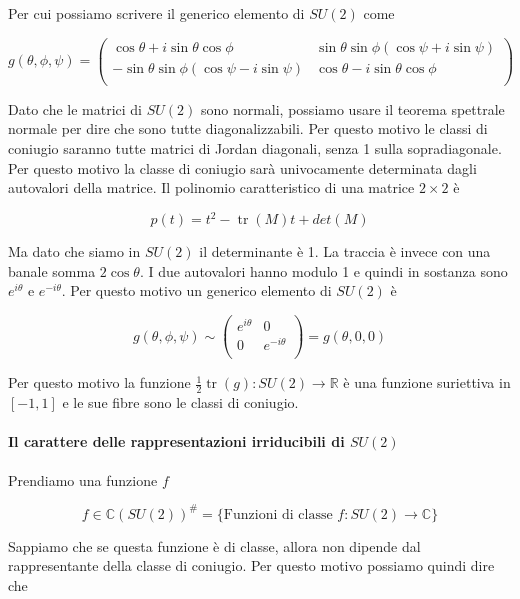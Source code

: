 \documentclass[11pt]{article}
\theoremstyle{plain}
\theoremstyle{definition}
\theoremstyle{remark}
\newcommand{\C}{\mathbb{C}}
\newcommand{\R}{\mathbb{R}}
\DeclareMathOperator{\tr}{tr}
\begin{document}
 Per cui possiamo scrivere il generico elemento di $SU(2)$ come

 \[
 g(\theta, \phi, \psi) = 
 \left(
 \begin{array}{cc}
   \cos\theta + i \sin\theta \cos\phi & \sin\theta\sin\phi( \cos\psi + i \sin\psi) \\
   -\sin\theta\sin\phi(\cos\psi - i \sin\psi) & \cos\theta - i \sin\theta\cos\phi  \\

 \end{array}
 \right)
 \]
 

 Dato che le matrici di $SU(2)$ sono normali, possiamo usare il teorema spettrale normale per dire che sono tutte diagonalizzabili. Per questo motivo le classi di coniugio saranno tutte matrici di Jordan diagonali, senza 1 sulla sopradiagonale. Per questo motivo la classe di coniugio sarà univocamente determinata dagli autovalori della matrice. Il polinomio caratteristico di una matrice $2\times 2$ è

 \[ p(t) = t^2 - \tr(M) t + det(M) \]

 Ma dato che siamo in $SU(2)$ il determinante è 1. La traccia è invece con una banale somma $2\cos\theta$. I due autovalori hanno modulo 1 e quindi in sostanza sono $e^{i\theta}$ e $e^{-i\theta}$. Per questo motivo un generico elemento di $SU(2)$ è


 \[
 g(\theta, \phi, \psi) \sim \left(
 \begin{array}{cc}
   e^{i\theta} & 0 \\
   0 & e^{-i\theta} \\
 \end{array}
 \right) = g(\theta, 0 , 0)
 \]




 Per questo motivo la funzione $\frac{1}{2} \tr(g) : SU(2) \to \R$ è una funzione suriettiva in $[-1,1]$ e le sue fibre sono le classi di coniugio.

 \paragraph{Il carattere delle rappresentazioni irriducibili di $SU(2)$}


 Prendiamo una funzione $f$

 \[ f \in \C(SU(2)) ^\# = \{ \text{Funzioni di classe } f: SU(2) \to \C  \} \]

 Sappiamo che se questa funzione è di classe, allora non dipende dal rappresentante della classe di coniugio. Per questo motivo possiamo quindi dire che
\end{document}

